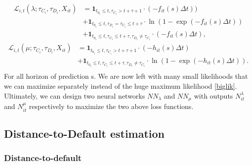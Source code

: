 \begin{align}
    \mathcal{L}_{i,t}(\lambda; \tau_{C_i},\tau_{D_i}, X_{it}) &= \textbf{1}_{t_{0_i} \leq t, \tau_{C_i} > t+\tau+1} \cdot (-f_{it}(s)\Delta t)) \\ \nonumber
    &+ \textbf{1}_{t_{0_i} \leq t, \tau_{D_i}=\tau_{C_i} \leq t+\tau}  \cdot \ln(1 - \exp(-f_{it}(s)\Delta t)) \\ \nonumber
    &+ \textbf{1}_{t_{0_i} \leq t, \tau_{C_i} \leq t+\tau, \tau_{D_i} \neq \tau_{C_i}} \cdot (-f_{it}(s)\Delta t),  \nonumber
\end{align}
\begin{align}
    \mathcal{L}_{i,t}(\mu; \tau_{C_i},\tau_{D_i}, X_{it}) &= \textbf{1}_{t_{0_i} \leq t, \tau_{C_i} > t+\tau+1} \cdot (- h_{it}(s)\Delta t) \\ \nonumber
    &+ \textbf{1}_{t_{0_i} \leq t, \tau_{C_i} \leq t+\tau, \tau_{D_i} \neq \tau_{C_i}} \cdot \ln(1-\exp(-h_{it}(s) \Delta t)). \\  \nonumber
\end{align}
For all horizon of prediction s. We are now left with many small likelihoods that we can maximize separately instead of the huge maximum likelihood \ref{biglik}. Ultimately, we can design two neural networks $NN_{\lambda}$ and $NN_{\mu}$ with outputs $N_{it}^{\lambda}$ and $N_{it}^{\mu}$ respectively to maximize the two above loss functions. 

\subsection{Distance-to-Default estimation}

\subsubsection{Distance-to-default}

